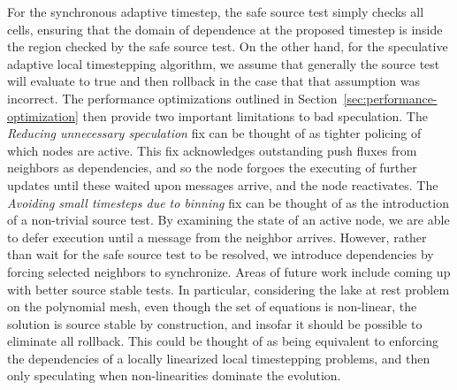 For the synchronous adaptive timestep, the safe source test simply checks all cells, ensuring that the domain of dependence at the proposed timestep is inside the region checked by the safe source test. On the other hand, for the speculative adaptive local timestepping algorithm, we assume that generally the source test will evaluate to true and then rollback in the case that that assumption was incorrect. The performance optimizations outlined in Section~\ref{sec:performance-optimization} then provide two important limitations to bad speculation. The {\em Reducing unnecessary speculation} fix can be thought of as tighter policing of which nodes are active. This fix acknowledges outstanding push fluxes from neighbors as dependencies, and so the node forgoes the executing of further updates until these waited upon messages arrive, and the node reactivates. The {\em Avoiding small timesteps due to binning} fix can be thought of as the introduction of a non-trivial source test. By examining the state of an active node, we are able to defer execution until a message from the neighbor arrives. However, rather than wait for the safe source test to be resolved, we introduce dependencies by forcing selected neighbors to synchronize. 
Areas of future work include coming up with better source stable tests. In particular, considering the lake at rest problem on the polynomial mesh, even though the set of equations is non-linear, the solution is source stable by construction, and insofar it should be possible to eliminate all rollback. This could be thought of as being equivalent to enforcing the dependencies of a locally linearized local timestepping problems, and then only speculating when non-linearities dominate the evolution.

